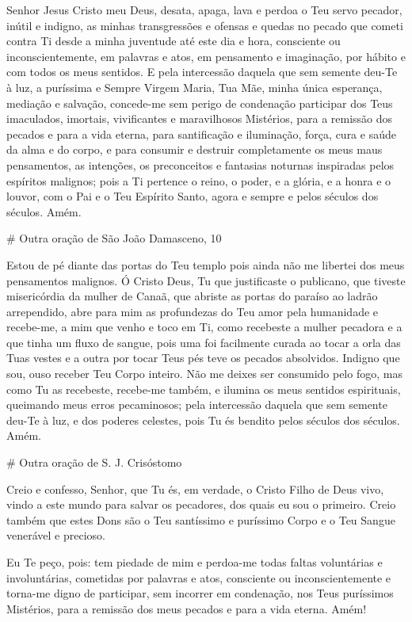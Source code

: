 \documentclass{subfiles}
\begin{document}
Senhor Jesus Cristo meu Deus, desata, apaga, lava e perdoa o Teu servo pecador,
inútil e indigno, as minhas transgressões e ofensas e quedas no pecado que
cometi contra Ti desde a minha juventude até este dia e hora, consciente ou
inconscientemente, em palavras e atos, em pensamento e imaginação, por hábito e
com todos os meus sentidos. E pela intercessão daquela que sem semente deu-Te à
luz, a puríssima e Sempre Virgem Maria, Tua Mãe, minha única esperança, mediação
e salvação, concede-me sem perigo de condenação participar dos Teus imaculados,
imortais, vivificantes e maravilhosos Mistérios, para a remissão dos pecados e
para a vida eterna, para santificação e iluminação, força, cura e saúde da alma
e do corpo, e para consumir e destruir completamente os meus maus pensamentos,
as intenções, os preconceitos e fantasias noturnas inspiradas pelos espíritos
malignos; pois a Ti pertence o reino, o poder, e a glória, e a honra e o louvor,
com o Pai e o Teu Espírito Santo, agora e sempre e pelos séculos dos séculos.
Amém.

# Outra oração de São João Damasceno, 10

Estou de pé diante das portas do Teu templo pois ainda não me libertei dos meus
pensamentos malignos. Ó Cristo Deus, Tu que justificaste o publicano, que
tiveste misericórdia da mulher de Canaã, que abriste as portas do paraíso ao
ladrão arrependido, abre para mim as profundezas do Teu amor pela humanidade e
recebe-me, a mim que venho e toco em Ti, como recebeste a mulher pecadora e a
que tinha um fluxo de sangue, pois uma foi facilmente curada ao tocar a orla das
Tuas vestes e a outra por tocar Teus pés teve os pecados absolvidos. Indigno que
sou, ouso receber Teu Corpo inteiro. Não me deixes ser consumido pelo fogo, mas
como Tu as recebeste, recebe-me também, e ilumina os meus sentidos espirituais,
queimando meus erros pecaminosos; pela intercessão daquela que sem semente
deu-Te à luz, e dos poderes celestes, pois Tu és bendito pelos séculos dos
séculos. Amém.

# Outra oração de S. J. Crisóstomo

Creio e confesso, Senhor, que Tu és, em verdade, o Cristo Filho de Deus vivo,
vindo a este mundo para salvar os pecadores, dos quais eu sou o primeiro. Creio
também que estes Dons são o Teu santíssimo e puríssimo Corpo e o Teu Sangue
venerável e precioso.

Eu Te peço, pois: tem piedade de mim e perdoa-me todas faltas voluntárias e
involuntárias, cometidas por palavras e atos, consciente ou inconscientemente e
torna-me digno de participar, sem incorrer em condenação, nos Teus puríssimos
Mistérios, para a remissão dos meus pecados e para a vida eterna. Amém!
\end{document}
